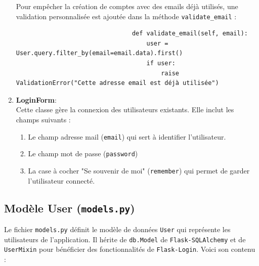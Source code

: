 \documentclass[a4paper,11pt]{article}
\begin{document}
\begin{enumerate}
                        \noindent Pour empêcher la création de comptes avec des emails déjà utilisés, une validation personnalisée est ajoutée dans la méthode \texttt{validate\_email} :
                        \begin{tcolorbox}[colback=lightgray!6, colframe=black, left=-45mm, right=5mm, top=2mm, bottom=0mm, boxrule=0.1mm]
                            \begin{verbatim}
                                def validate_email(self, email):
                                    user = User.query.filter_by(email=email.data).first()
                                    if user:
                                        raise ValidationError("Cette adresse email est déjà utilisée")
                            \end{verbatim}
                        \end{tcolorbox}

                    \item \textbf{LoginForm}:\\
                        \noindent Cette classe gère la connexion des utilisateurs existants. Elle inclut les champs suivants :
                        \begin{enumerate}
                            \item Le champ adresse mail (\texttt{email}) qui sert à identifier l'utilisateur.
                            \item Le champ mot de passe (\texttt{password})
                            \item La case à cocher "Se souvenir de moi" (\texttt{remember}) qui permet de garder l'utilisateur connecté.
                        \end{enumerate}
                \end{enumerate}

            \subsection{Modèle User (\texttt{models.py})}
                \noindent Le fichier \texttt{models.py} définit le modèle de données \texttt{User} qui représente les utilisateurs de l'application. Il hérite de \texttt{db.Model} de \texttt{Flask-SQLAlchemy} et de \texttt{UserMixin} pour bénéficier des fonctionnalités de \texttt{Flask-Login}. Voici son contenu :

                
\end{document}
